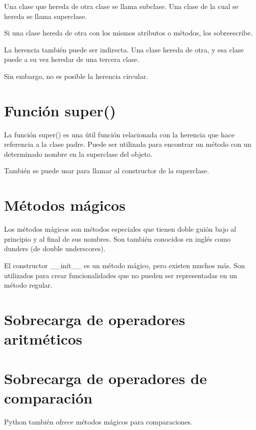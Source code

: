 \documentclass{report}
\begin{document}

Una clase que hereda de otra clase se llama subclase. Una clase de la cual se hereda se llama superclase.

Si una clase hereda de otra con los mismos atributos o métodos, los sobreescribe.


La herencia también puede ser indirecta. Una clase hereda de otra, y esa clase puede a su vez heredar de una tercera clase.


Sin embargo, no es posible la herencia circular.

\section{Función super()}

La función super() es una útil función relacionada con la herencia que hace referencia a la clase padre. Puede ser utilizada para encontrar un método con un determinado nombre en la superclase del objeto.


También se puede usar para llamar al constructor de la superclase.


\section{Métodos mágicos}

Los métodos mágicos son métodos especiales que tienen doble guión bajo al principio y al final de sus nombres. Son también conocidos en inglés como dunders (de double underscores).

El constructor \_\_init\_\_ es un método mágico, pero existen muchos más. Son utilizados para crear funcionalidades que no pueden ser representadas en un método regular.

\section{Sobrecarga de operadores aritméticos}

\section{Sobrecarga de operadores de comparación}

Python también ofrece métodos mágicos para comparaciones.

\end{document}
